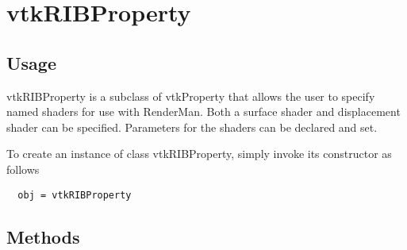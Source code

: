 \section{vtkRIBProperty}

\subsection{Usage}

 vtkRIBProperty is a subclass of vtkProperty that allows the user to
 specify named shaders for use with RenderMan. Both a surface shader
 and displacement shader can be specified. Parameters for the shaders
 can be declared and set.


To create an instance of class vtkRIBProperty, simply
invoke its constructor as follows
\begin{verbatim}
  obj = vtkRIBProperty
\end{verbatim}
\subsection{Methods}

